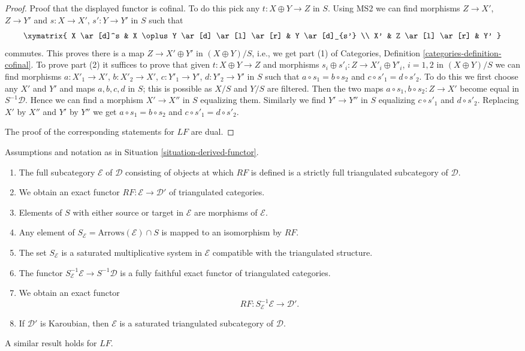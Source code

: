 \begin{proof}
\medskip\noindent
Proof that the displayed functor is cofinal.
To do this pick any $t : X \oplus Y \to Z$ in $S$.
Using MS2 we can find morphisms $Z \to X'$, $Z \to Y'$
and $s : X \to X'$, $s' : Y \to Y'$ in $S$ such that
$$
\xymatrix{
X \ar[d]^s & X \oplus Y \ar[d] \ar[l] \ar[r] & Y \ar[d]_{s'} \\
X' & Z \ar[l] \ar[r] & Y'
}
$$
commutes. This proves there is a map $Z \to X' \oplus Y'$ in
$(X \oplus Y)/S$, i.e., we get part (1) of Categories, Definition
\ref{categories-definition-cofinal}. To prove part (2) it suffices
to prove that given $t : X \oplus Y \to Z$ and morphisms
$s_i \oplus s'_i : Z \to X'_i \oplus Y'_i$, $i = 1, 2$ in $(X \oplus Y)/S$
we can find morphisms $a : X'_1 \to X'$, $b : X'_2 \to X'$,
$c : Y'_1 \to Y'$, $d : Y'_2 \to Y'$ in $S$ such that
$a \circ s_1 = b \circ s_2$ and $c \circ s'_1 = d \circ s'_2$.
To do this we first choose any $X'$ and $Y'$ and maps $a, b, c, d$
in $S$; this is possible as $X/S$ and $Y/S$ are filtered. Then the
two maps $a \circ s_1, b \circ s_2 : Z \to X'$ become equal in
$S^{-1}\mathcal{D}$. Hence we can find a morphism
$X' \to X''$ in $S$ equalizing them. Similarly we find $Y' \to Y''$ in $S$
equalizing $c \circ s'_1$ and $d \circ s'_2$. Replacing $X'$ by $X''$ and
$Y'$ by $Y''$ we get $a \circ s_1 = b \circ s_2$ and
$c \circ s'_1 = d \circ s'_2$.

\medskip\noindent
The proof of the corresponding statements for $LF$ are dual.
\end{proof}

\begin{proposition}
\label{proposition-derived-functor}
Assumptions and notation as in Situation \ref{situation-derived-functor}.
\begin{enumerate}
\item The full subcategory $\mathcal{E}$ of $\mathcal{D}$ consisting of
objects at which $RF$ is defined is a strictly full triangulated
subcategory of $\mathcal{D}$.
\item We obtain an exact functor
$RF : \mathcal{E} \longrightarrow \mathcal{D}'$
of triangulated categories.
\item Elements of $S$ with either source or target
in $\mathcal{E}$ are morphisms of $\mathcal{E}$.
\item Any element of $S_\mathcal{E} = \text{Arrows}(\mathcal{E}) \cap S$
is mapped to an isomorphism by $RF$.
\item The set $S_\mathcal{E}$ is a saturated multiplicative system in
$\mathcal{E}$ compatible with the triangulated structure.
\item The functor $S_\mathcal{E}^{-1}\mathcal{E} \to S^{-1}\mathcal{D}$
is a fully faithful exact functor of triangulated categories.
\item We obtain an exact functor
$$
RF : S_\mathcal{E}^{-1}\mathcal{E} \longrightarrow \mathcal{D}'.
$$
\item If $\mathcal{D}'$ is Karoubian, then $\mathcal{E}$ is a saturated
triangulated subcategory of $\mathcal{D}$.
\end{enumerate}
A similar result holds for $LF$.
\end{proposition}

